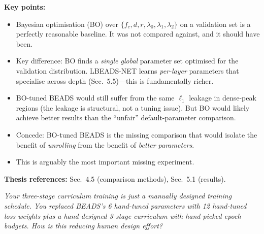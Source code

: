 \documentclass[11pt, letterpaper]{article}
\newcounter{qcounter}
\newcommand{\question}[1]{%
  \stepcounter{qcounter}%
  \begin{questionbox}[Q\theqcounter]%
    \itshape #1%
  \end{questionbox}%
}
\begin{document}
\begin{answerbox}
\textbf{Key points:}
\begin{itemize}[nosep]
  \item Bayesian optimisation (BO) over $\{f_c, d, r, \lambda_0,
        \lambda_1, \lambda_2\}$ on a validation set is a perfectly
        reasonable baseline.  It was not compared against, and it
        should have been.
  \item Key difference: BO finds a \emph{single global} parameter
        set optimised for the validation distribution.  LBEADS-NET
        learns \emph{per-layer} parameters that specialise across
        depth (Sec.~5.5)---this is fundamentally richer.
  \item BO-tuned BEADS would still suffer from the same $\ell_1$
        leakage in dense-peak regions (the leakage is structural,
        not a tuning issue).  But BO would likely achieve better
        results than the ``unfair'' default-parameter comparison.
  \item Concede: BO-tuned BEADS is the missing comparison that would
        isolate the benefit of \emph{unrolling} from the benefit of
        \emph{better parameters}.
  \item This is arguably the most important missing experiment.
\end{itemize}
\textbf{Thesis references:} Sec.~4.5 (comparison methods), Sec.~5.1 (results).
\end{answerbox}

\question{Your three-stage curriculum training is just a manually designed
training schedule.  You replaced BEADS's 6 hand-tuned parameters
with 12 hand-tuned loss weights \emph{plus} a hand-designed
3-stage curriculum with hand-picked epoch budgets.  How is this
reducing human design effort?}
\end{document}
